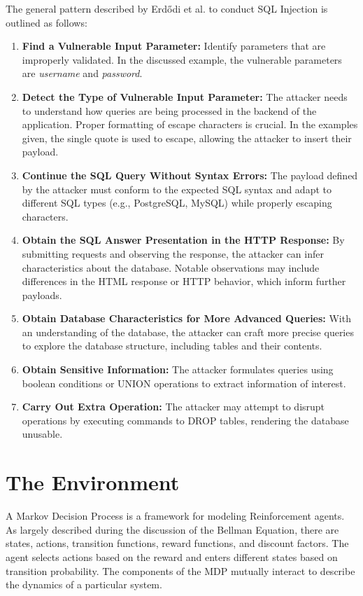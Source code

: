 \documentclass[conference]{IEEEtran}
\begin{document}
\noindent The general pattern described by Erd\H{o}di et al. to conduct SQL Injection is outlined as follows:

\begin{enumerate}
  \item \textbf{Find a Vulnerable Input Parameter:} Identify parameters that are improperly validated. In the discussed example, the vulnerable parameters are \textit{username} and \textit{password}.

  \item \textbf{Detect the Type of Vulnerable Input Parameter:} The attacker needs to understand how queries are being processed in the backend of the application. Proper formatting of escape characters is crucial. In the examples given, the single quote is used to escape, allowing the attacker to insert their payload.

  \item \textbf{Continue the SQL Query Without Syntax Errors:} The payload defined by the attacker must conform to the expected SQL syntax and adapt to different SQL types (e.g., PostgreSQL, MySQL) while properly escaping characters.

  \item \textbf{Obtain the SQL Answer Presentation in the HTTP Response:} By submitting requests and observing the response, the attacker can infer characteristics about the database. Notable observations may include differences in the HTML response or HTTP behavior, which inform further payloads.

  \item \textbf{Obtain Database Characteristics for More Advanced Queries:} With an understanding of the database, the attacker can craft more precise queries to explore the database structure, including tables and their contents.

  \item \textbf{Obtain Sensitive Information:} The attacker formulates queries using boolean conditions or UNION operations to extract information of interest.

  \item \textbf{Carry Out Extra Operation:} The attacker may attempt to disrupt operations by executing commands to DROP tables, rendering the database unusable.
\end{enumerate}

\section{The Environment}
A Markov Decision Process is a framework for modeling Reinforcement agents. As largely described during the discussion of the  Bellman Equation, there are states, actions, transition functions, reward functions, and discount factors. The agent selects actions based on the reward and enters different states based on transition probability. The components of the MDP mutually interact to describe the dynamics of a particular system.
\end{document}
